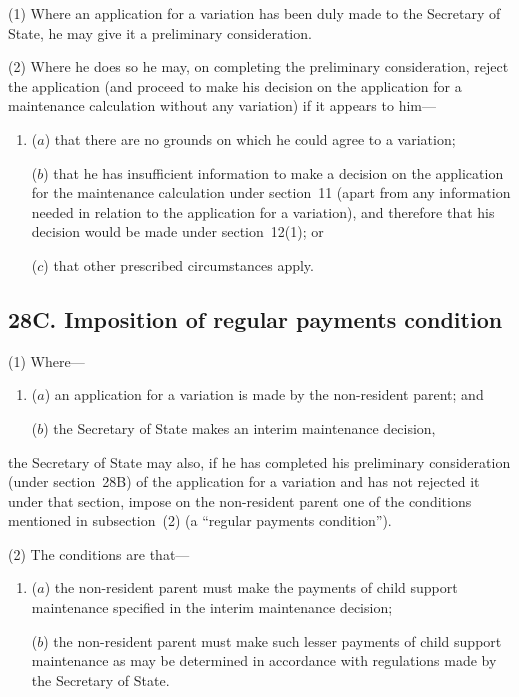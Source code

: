 \documentclass[12pt,a4paper]{article}
\begin{document}
(1) Where an application for a variation has been duly made to the Secretary of State, he may give it a preliminary consideration.

(2) Where he does so he may, on completing the preliminary consideration, reject the application (and proceed to make his decision on the application for a maintenance calculation without any variation) if it appears to him—
\begin{enumerate}\item[]
($a$) that there are no grounds on which he could agree to a variation;

($b$) that he has insufficient information to make a decision on the application for the maintenance calculation under section~11 (apart from any information needed in relation to the application for a variation), and therefore that his decision would be made under section~12(1); or

($c$) that other prescribed circumstances apply.
\end{enumerate}


\subsection{28C. Imposition of regular payments condition}

(1) Where—
\begin{enumerate}\item[]
($a$) an application for a variation is made by the non-resident parent; and

($b$) the Secretary of State makes an interim maintenance decision,
\end{enumerate}
the Secretary of State may also, if he has completed his preliminary consideration (under section~28B) of the application for a variation and has not rejected it under that section, impose on the non-resident parent one of the conditions mentioned in subsection~(2)  (a “regular payments condition”).

(2) The conditions are that—
\begin{enumerate}\item[]
($a$) the non-resident parent must make the payments of child support maintenance specified in the interim maintenance decision;

($b$) the non-resident parent must make such lesser payments of child support maintenance as may be determined in accordance with regulations made by the Secretary of State.
\end{enumerate}
\end{document}
